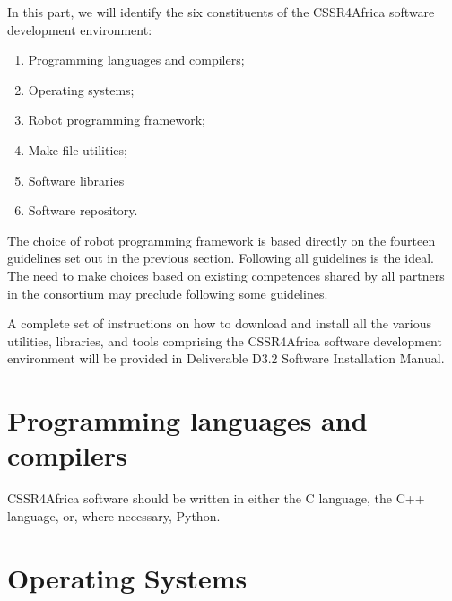 \documentclass{CSSRforAfrica}
\begin{document}
In this part, we will identify the six constituents of the CSSR4Africa software development environment:
\begin{enumerate}
\item Programming languages and compilers; \vspace{-3mm}
\item Operating systems; \vspace{-3mm}
\item Robot programming framework; \vspace{-3mm}
\item Make file utilities; \vspace{-3mm}
\item Software libraries \vspace{-3mm}
\item Software repository. \vspace{-0mm}
\end{enumerate}
The  choice of robot programming framework is based directly on the fourteen guidelines set out in the previous section.
Following all guidelines is the ideal. The need to make choices based on existing competences shared by all partners in the consortium may preclude following some guidelines.

A complete set of instructions on how to download and install all the various utilities, libraries, and tools comprising the CSSR4Africa  software development environment will be provided in Deliverable D3.2 Software Installation Manual.  

\section{Programming languages and compilers}
CSSR4Africa software should be written in either the C language, the C++ language, or, where necessary, Python.
 

\section{Operating Systems}
\label{section:os}
\end{document}
